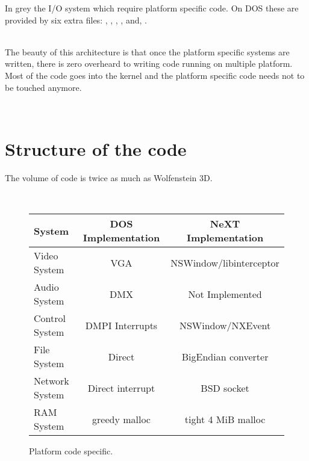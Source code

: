 


\par



In grey the I/O system which require platform specific code. On DOS these are provided by six extra files: , , , ,  and, .\\
\par
{}\\

The beauty of this architecture is that once the platform specific systems are written, there is zero overheard to writing code running on multiple platform. Most of the code goes into the kernel and the platform specific code needs not to be touched anymore.\\
\par
{}\\

\section{Structure of the code}
The volume of code is twice as much as Wolfenstein 3D.\\
\par
{}
\par





\\
\par
 \begin{figure}[H]
\centering  
\begin{tabularx}{\textwidth}{ L{0.22} | C{0.39} | C{0.39} }
  \toprule
  \textbf{System} & \textbf{DOS Implementation} & \textbf{NeXT Implementation}\\
  \toprule 
    Video System & VGA & NSWindow/libinterceptor\\
    Audio System & DMX & Not Implemented\\
    Control System & DMPI Interrupts & NSWindow/NXEvent \\
    File  System & Direct & BigEndian converter\\
    Network System & Direct interrupt & BSD socket \\
    RAM System & greedy malloc & tight 4 MiB malloc\\
   \toprule
\end{tabularx}
\caption{Platform code specific.}
\end{figure}

